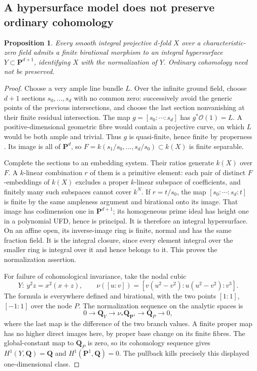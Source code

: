 \documentclass[11pt]{article}
\newtheorem{proposition}[theorem]{Proposition}
\theoremstyle{definition}\newtheorem{definition}[theorem]{Definition}
\theoremstyle{remark}\newtheorem{remark}[theorem]{Remark}
\newcommand{\Q}{\mathbf Q}\newcommand{\Z}{\mathbf Z}
\begin{document}
\subsection{A hypersurface model does not preserve ordinary cohomology}
\begin{proposition}\label{prop:hypersurface-normalization}
Every smooth integral projective $d$-fold $X$ over a characteristic-zero field admits a finite birational morphism to an integral hypersurface $Y\subset\mathbf P^{d+1}$, identifying $X$ with the normalization of $Y$. Ordinary cohomology need not be preserved.
\end{proposition}
\begin{proof}
Choose a very ample line bundle $L$. Over the infinite ground field, choose $d+1$ sections $s_0,\ldots,s_d$ with no common zero: successively avoid the generic points of the previous intersections, and choose the last section nonvanishing at their finite residual intersection. The map $g=[s_0:\cdots:s_d]$ has $g^*\mathcal O(1)=L$. A positive-dimensional geometric fibre would contain a projective curve, on which $L$ would be both ample and trivial. Thus $g$ is quasi-finite, hence finite by properness \cite[Tag 02LS]{StacksFinite}. Its image is all of $\mathbf P^d$, so $F=k(s_1/s_0,\ldots,s_d/s_0)\subset k(X)$ is finite separable.

Complete the sections to an embedding system. Their ratios generate $k(X)$ over $F$. A $k$-linear combination $r$ of them is a primitive element: each pair of distinct $F$-embeddings of $k(X)$ excludes a proper $k$-linear subspace of coefficients, and finitely many such subspaces cannot cover $k^N$. If $r=t/s_0$, the map $[s_0:\cdots:s_d:t]$ is finite by the same ampleness argument and birational onto its image. That image has codimension one in $\mathbf P^{d+1}$; its homogeneous prime ideal has height one in a polynomial UFD, hence is principal. It is therefore an integral hypersurface. On an affine open, its inverse-image ring is finite, normal and has the same fraction field. It is the integral closure, since every element integral over the smaller ring is integral over it and hence belongs to it. This proves the normalization assertion.

For failure of cohomological invariance, take the nodal cubic
\[
 Y:\ y^2z=x^2(x+z),\qquad
 \nu([u:v])=[v(u^2-v^2):u(u^2-v^2):v^3].
\]
The formula is everywhere defined and birational, with the two points $[1:1]$, $[-1:1]$ over the node $P$. The normalization sequence on the analytic spaces is
\[
 0\to\Q_Y\to\nu_*\Q_{\mathbf P^1}\to\Q_P\to0,
\]
where the last map is the difference of the two branch values. A finite proper map has no higher direct images here, by proper base change on its finite fibres. The global-constant map to $\Q_P$ is zero, so its cohomology sequence gives $H^1(Y,\Q)=\Q$ and $H^1(\mathbf P^1,\Q)=0$. The pullback kills precisely this displayed one-dimensional class.
\end{proof}
\end{document}

